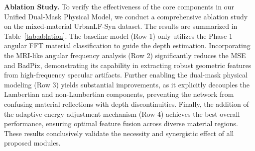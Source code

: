 \documentclass[lettersize,journal]{IEEEtran}
\begin{document}
\begin{table}[t]
\centering
\caption{Quantitative Comparison with State-of-the-Art Light Field Depth Estimation Methods}
\label{tab:sota_comparison}
\end{table}

\textbf{Ablation Study.}
To verify the effectiveness of the core components in our Unified Dual-Mask Physical Model, we conduct a comprehensive ablation study on the mixed-material UrbanLF-Syn dataset. The results are summarized in Table~\ref{tab:ablation}. The baseline model (Row 1) only utilizes the Phase 1 angular FFT material classification to guide the depth estimation. Incorporating the MRI-like angular frequency analysis (Row 2) significantly reduces the MSE and BadPix, demonstrating its capability in extracting robust geometric features from high-frequency specular artifacts. Further enabling the dual-mask physical modeling (Row 3) yields substantial improvements, as it explicitly decouples the Lambertian and non-Lambertian components, preventing the network from confusing material reflections with depth discontinuities. Finally, the addition of the adaptive energy adjustment mechanism (Row 4) achieves the best overall performance, ensuring optimal feature fusion across diverse material regions. These results conclusively validate the necessity and synergistic effect of all proposed modules.
\end{document}
